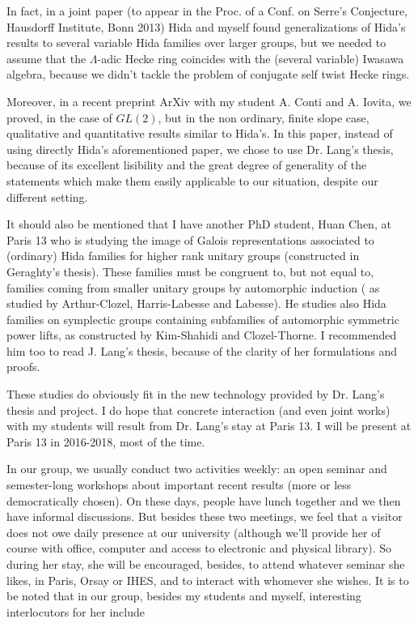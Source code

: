 \documentclass[12pt]{amsart}
\theoremstyle{definition}
\theoremstyle{definition}
\theoremstyle{definition}
\theoremstyle{definition}
\theoremstyle{definition}
\begin{document}
In fact, in a joint paper
 (to appear in the Proc. of a Conf. on Serre's Conjecture, Hausdorff Institute, Bonn 2013)
Hida and myself found generalizations of Hida's results to several variable Hida families over larger groups, but
we needed to assume that the
$\Lambda$-adic  Hecke ring coincides with the (several variable) Iwasawa algebra, because 
we didn't tackle the problem of  conjugate self twist Hecke rings. 


Moreover, in a recent preprint ArXiv with my student A. Conti and A. Iovita, we proved, in the case of $GL(2)$, 
but in the non ordinary, 
finite slope case, qualitative and quantitative results similar to Hida's. 
In this paper, instead of using directly Hida's aforementioned paper, we chose to use Dr. Lang's thesis, because of its excellent lisibility and
the great degree of generality of the statements which make them easily applicable to our situation, 
despite our different setting.

It should also be mentioned that I have another PhD student, Huan Chen, at Paris 13 who
 is studying the image of Galois representations associated to  (ordinary) Hida families for higher rank unitary groups
(constructed in Geraghty's thesis). These families must be congruent to, but not equal to, families coming  from smaller unitary groups
by automorphic induction ( as studied by Arthur-Clozel, Harris-Labesse and Labesse). He studies also
 Hida families on symplectic groups containing subfamilies of automorphic symmetric power lifts,
 as constructed by Kim-Shahidi and Clozel-Thorne. I recommended him too 
to read J. Lang's thesis, because of the clarity of her formulations and proofs.

These studies do obviously fit in the new technology provided by Dr. Lang's thesis and project. I do hope that 
concrete interaction (and even joint works) with my students will result from Dr. Lang's stay at Paris 13.
I will be present at Paris 13 in 2016-2018, most of the time.

In our group, we usually conduct two activities weekly: an open seminar and semester-long workshops about  important recent results 
(more or less democratically chosen). On these days, people have lunch together and we then have informal discussions.
But besides these two meetings, we feel that a visitor does not owe daily presence at our university
(although we'll provide her of course with office, computer and access to electronic and physical library).
So during her stay, she will be encouraged, besides,  to attend whatever seminar she likes, in Paris, Orsay or IHES, 
and to interact with whomever she wishes. It is to be noted that in our group, besides my students and myself, 
interesting interlocutors for her include 
\end{document}

